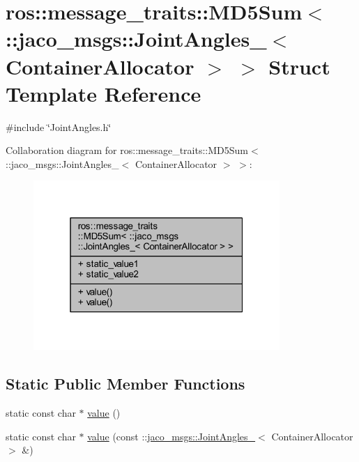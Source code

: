 \hypertarget{structros_1_1message__traits_1_1MD5Sum_3_01_1_1jaco__msgs_1_1JointAngles___3_01ContainerAllocator_01_4_01_4}{}\section{ros\+:\+:message\+\_\+traits\+:\+:M\+D5\+Sum$<$ \+:\+:jaco\+\_\+msgs\+:\+:Joint\+Angles\+\_\+$<$ Container\+Allocator $>$ $>$ Struct Template Reference}
\label{structros_1_1message__traits_1_1MD5Sum_3_01_1_1jaco__msgs_1_1JointAngles___3_01ContainerAllocator_01_4_01_4}


{\ttfamily \#include \char`\"{}Joint\+Angles.\+h\char`\"{}}



Collaboration diagram for ros\+:\+:message\+\_\+traits\+:\+:M\+D5\+Sum$<$ \+:\+:jaco\+\_\+msgs\+:\+:Joint\+Angles\+\_\+$<$ Container\+Allocator $>$ $>$\+:
\nopagebreak
\begin{figure}[H]
\begin{center}
\leavevmode
\includegraphics[width=265pt]{d1/d99/structros_1_1message__traits_1_1MD5Sum_3_01_1_1jaco__msgs_1_1JointAngles___3_01ContainerAllocator_01_4_01_4__coll__graph}
\end{center}
\end{figure}
\subsection*{Static Public Member Functions}
\begin{DoxyCompactItemize}
\item 
static const char $\ast$ \hyperlink{structros_1_1message__traits_1_1MD5Sum_3_01_1_1jaco__msgs_1_1JointAngles___3_01ContainerAllocator_01_4_01_4_a43d5bb8ecf10a6e1051466f70a36fbf0}{value} ()
\item 
static const char $\ast$ \hyperlink{structros_1_1message__traits_1_1MD5Sum_3_01_1_1jaco__msgs_1_1JointAngles___3_01ContainerAllocator_01_4_01_4_add8ccd6f3104a64d73785c0490411f2c}{value} (const \+::\hyperlink{structjaco__msgs_1_1JointAngles__}{jaco\+\_\+msgs\+::\+Joint\+Angles\+\_\+}$<$ Container\+Allocator $>$ \&)
\end{DoxyCompactItemize}
